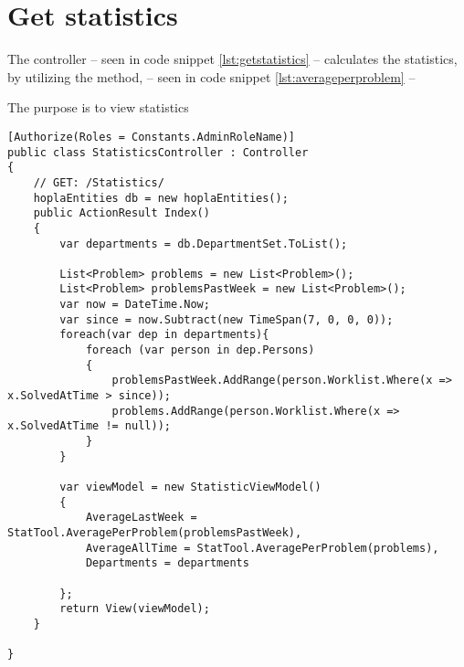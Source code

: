 \section{Get statistics}
\label{sec:getstatistics}

The  controller -- seen in code snippet \ref{lst:getstatistics} -- calculates the statistics, by utilizing the  method, -- seen in code snippet \ref{lst:averageperproblem} --

The purpose is to view statistics 

\begin{lstlisting}[style=sourceCode, caption=\myCaption{The StatisticsController controller}, label=lst:getstatistics]
[Authorize(Roles = Constants.AdminRoleName)]
public class StatisticsController : Controller
{
    // GET: /Statistics/
    hoplaEntities db = new hoplaEntities();
    public ActionResult Index()
    {
        var departments = db.DepartmentSet.ToList();
        
        List<Problem> problems = new List<Problem>();
        List<Problem> problemsPastWeek = new List<Problem>();
        var now = DateTime.Now;
        var since = now.Subtract(new TimeSpan(7, 0, 0, 0));
        foreach(var dep in departments){
            foreach (var person in dep.Persons)
            {
                problemsPastWeek.AddRange(person.Worklist.Where(x => x.SolvedAtTime > since));
                problems.AddRange(person.Worklist.Where(x => x.SolvedAtTime != null));
            }
        }

        var viewModel = new StatisticViewModel()
        {
            AverageLastWeek = StatTool.AveragePerProblem(problemsPastWeek),
            AverageAllTime = StatTool.AveragePerProblem(problems),
            Departments = departments
            
        };
        return View(viewModel);
    }

}
\end{lstlisting}


